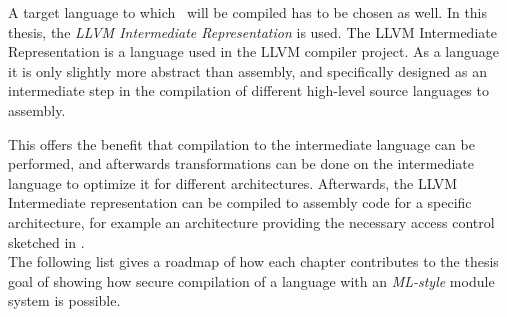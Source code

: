 A target language to which \MiniML\ will be compiled has to be chosen as well.
In this thesis, the \emph{LLVM Intermediate Representation} is used.
The LLVM Intermediate Representation is a language used in the LLVM compiler project.
As a language it is only slightly more abstract than assembly, and specifically designed as an intermediate step in the compilation of different high-level source languages to assembly.

This offers the benefit that compilation to the intermediate language can be performed, and afterwards transformations can be done on the intermediate language to optimize it for different architectures.
Afterwards, the LLVM Intermediate representation can be compiled to assembly code for a specific architecture, for example an architecture providing the necessary access control sketched in .
\\[1em]
The following list gives a roadmap of how each chapter contributes to the thesis goal of showing how secure compilation of a language with an \emph{ML-style} module system is possible.

